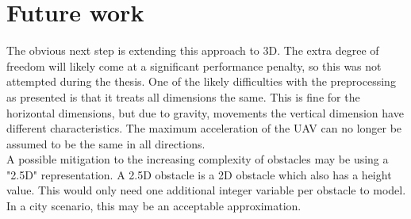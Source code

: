 \section{Future work}


%
%


The obvious next step is extending this approach to 3D. The extra degree of freedom will likely come at a significant performance penalty, so this was not attempted during the thesis. One of the likely difficulties with the preprocessing as presented is that it treats all dimensions the same. This is fine for the horizontal dimensions, but due to gravity, movements the vertical dimension have different characteristics. The maximum acceleration of the UAV can no longer be assumed to be the same in all directions.\\
A possible mitigation to the increasing complexity of obstacles may be using a "2.5D" representation. A 2.5D obstacle is a 2D obstacle which also has a height value. This would only need one additional integer variable per obstacle to model. In a city scenario, this may be an acceptable approximation. \\

